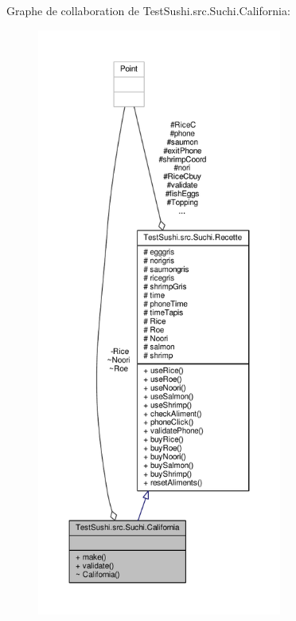 Graphe de collaboration de Test\+Sushi.\+src.\+Suchi.\+California\+:\nopagebreak
\begin{figure}[H]
\begin{center}
\leavevmode
\includegraphics[height=550pt]{classTestSushi_1_1src_1_1Suchi_1_1California__coll__graph}
\end{center}
\end{figure}
